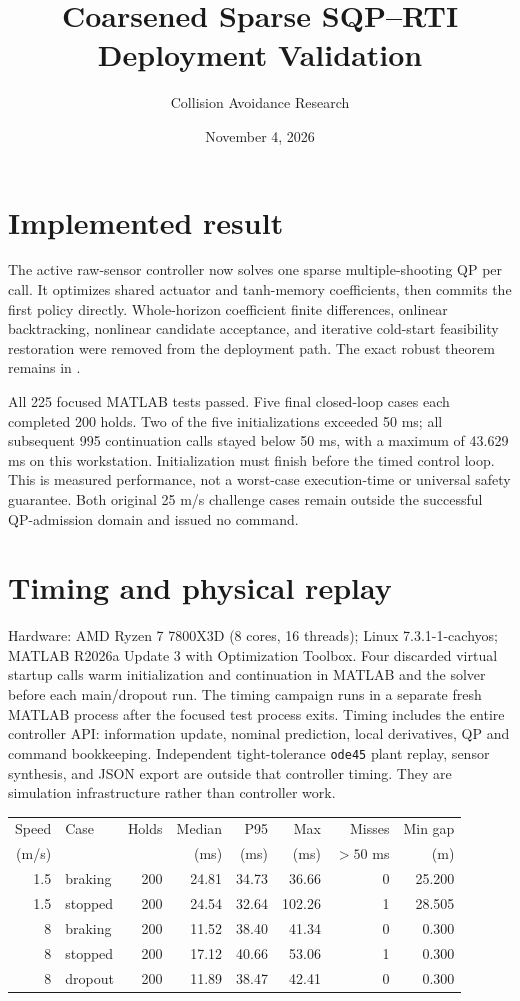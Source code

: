 \documentclass[11pt]{article}
\title{Coarsened Sparse SQP--RTI Deployment Validation}
\author{Collision Avoidance Research}\date{November 4, 2026}
\begin{document}
\maketitle
\section*{Implemented result}
The active raw-sensor controller now solves one sparse multiple-shooting QP
per call. It optimizes shared actuator and tanh-memory coefficients, then commits
the first policy directly. Whole-horizon coefficient finite differences,
onlinear backtracking, nonlinear candidate acceptance, and iterative cold-start
feasibility restoration were removed from the deployment path. The exact
robust theorem remains in .

All 225 focused MATLAB tests passed. Five final closed-loop cases each completed
200 holds. Two of the five initializations exceeded 50 ms; all subsequent
995 continuation calls stayed below 50 ms, with a maximum of 43.629 ms on
this workstation. Initialization must finish before the timed control loop. This is measured performance, not a worst-case
execution-time or universal safety guarantee. Both original 25 m/s challenge
cases remain outside the successful QP-admission domain and issued no command.

\section*{Timing and physical replay}
Hardware: AMD Ryzen 7 7800X3D (8 cores, 16 threads); Linux 7.3.1-1-cachyos;
MATLAB R2026a Update 3 with Optimization Toolbox. Four discarded virtual startup calls
warm initialization and continuation in MATLAB and the solver before each main/dropout run. The timing campaign runs in a separate fresh MATLAB process after the focused test process exits. Timing includes the
entire controller API: information update, nominal prediction, local derivatives,
QP and command bookkeeping. Independent tight-tolerance \texttt{ode45} plant
replay, sensor synthesis, and JSON export are outside that controller timing.
They are simulation infrastructure rather than controller work.

\begin{center}\small
\begin{tabular}{@{}rlrrrrrr@{}}\toprule
Speed & Case & Holds & Median & P95 & Max & Misses & Min gap\\
(m/s) & & & (ms) & (ms) & (ms) & $>50$ ms & (m)\\\midrule
1.5 & braking & 200 & 24.81 & 34.73 & 36.66 & 0 & 25.200 \\
1.5 & stopped & 200 & 24.54 & 32.64 & 102.26 & 1 & 28.505 \\
8 & braking & 200 & 11.52 & 38.40 & 41.34 & 0 & 0.300 \\
8 & stopped & 200 & 17.12 & 40.66 & 53.06 & 1 & 0.300 \\
8 & dropout & 200 & 11.89 & 38.47 & 42.41 & 0 & 0.300 \\
\bottomrule\end{tabular}\end{center}
\end{document}
